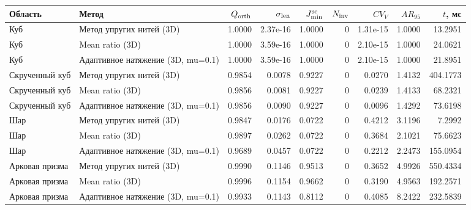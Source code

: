 \begin{tabular}{llrrrrrrr}
\toprule
Область & Метод & $Q_{\rm orth}$ & $\sigma_{\rm len}$ & $J_{\min}^{\rm sc}$ & $N_{\rm inv}$ & $CV_V$ & $AR_{95}$ & $t$, мс \\
\midrule
Куб & Метод упругих нитей (3D) & 1.0000 & 2.37e-16 & 1.0000 & 0 & 1.31e-15 & 1.0000 & 13.2951 \\
Куб & Mean ratio (3D) & 1.0000 & 3.59e-16 & 1.0000 & 0 & 2.10e-15 & 1.0000 & 24.0621 \\
Куб & Адаптивное натяжение (3D, mu=0.1) & 1.0000 & 3.59e-16 & 1.0000 & 0 & 2.10e-15 & 1.0000 & 21.8951 \\
Скрученный куб & Метод упругих нитей (3D) & 0.9854 & 0.0078 & 0.9227 & 0 & 0.0270 & 1.4132 & 404.1773 \\
Скрученный куб & Mean ratio (3D) & 0.9856 & 0.0081 & 0.9227 & 0 & 0.0239 & 1.4133 & 68.2321 \\
Скрученный куб & Адаптивное натяжение (3D, mu=0.1) & 0.9856 & 0.0090 & 0.9227 & 0 & 0.0096 & 1.4292 & 73.6198 \\
Шар & Метод упругих нитей (3D) & 0.9847 & 0.0176 & 0.0722 & 0 & 0.4212 & 3.1196 & 7.2992 \\
Шар & Mean ratio (3D) & 0.9897 & 0.0262 & 0.0722 & 0 & 0.3684 & 2.1021 & 75.6623 \\
Шар & Адаптивное натяжение (3D, mu=0.1) & 0.9689 & 0.0457 & 0.0722 & 0 & 0.2212 & 2.2473 & 155.0954 \\
Арковая призма & Метод упругих нитей (3D) & 0.9990 & 0.1146 & 0.9513 & 0 & 0.3652 & 4.9926 & 550.4334 \\
Арковая призма & Mean ratio (3D) & 0.9996 & 0.1154 & 0.9662 & 0 & 0.3190 & 4.9563 & 192.2571 \\
Арковая призма & Адаптивное натяжение (3D, mu=0.1) & 0.9933 & 0.1143 & 0.8112 & 0 & 0.4085 & 8.2422 & 232.5839 \\
\bottomrule
\end{tabular}
